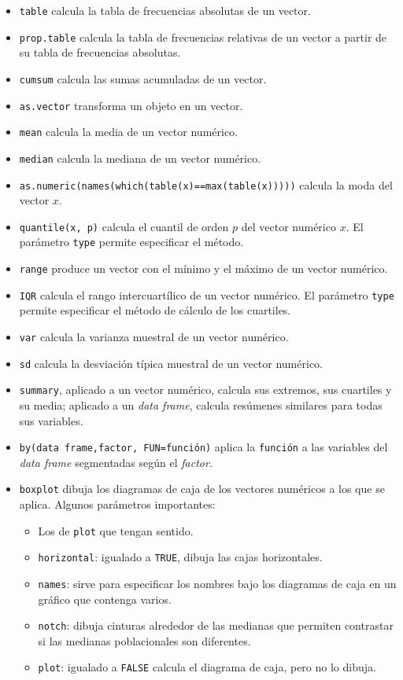 \documentclass[]{book}
\theoremstyle{definition}
\theoremstyle{definition}
\theoremstyle{definition}
\theoremstyle{remark}
\begin{document}
\begin{itemize}
\item
  \texttt{table} calcula la tabla de frecuencias absolutas de un vector.
\item
  \texttt{prop.table} calcula la tabla de frecuencias relativas de un vector a partir de su tabla de frecuencias absolutas.
\item
  \texttt{cumsum} calcula las sumas acumuladas de un vector.
\item
  \texttt{as.vector} transforma un objeto en un vector.
\item
  \texttt{mean} calcula la media de un vector numérico.
\item
  \texttt{median} calcula la mediana de un vector numérico.
\item
  \texttt{as.numeric(names(which(table(x)==max(table(x)))))} calcula la moda del vector \(x\).
\item
  \texttt{quantile(x,\ p)} calcula el cuantil de orden \(p\) del vector numérico \(x\). El parámetro \texttt{type} permite especificar el método.
\item
  \texttt{range} produce un vector con el mínimo y el máximo de un vector numérico.
\item
  \texttt{IQR} calcula el rango intercuartílico de un vector numérico. El parámetro \texttt{type} permite especificar el método de cálculo de los cuartiles.
\item
  \texttt{var} calcula la varianza muestral de un vector numérico.
\item
  \texttt{sd} calcula la desviación típica muestral de un vector numérico.
\item
  \texttt{summary}, aplicado a un vector numérico, calcula sus extremos, sus cuartiles y su media; aplicado a un \emph{data frame}, calcula resúmenes similares para todas sus variables.
\item
  \texttt{by(data\ frame,factor,\ FUN=función)} aplica la \texttt{función} a las variables del \emph{data frame} segmentadas según el \emph{factor}.
\item
  \texttt{boxplot} dibuja los diagramas de caja de los vectores numéricos a los que se aplica.
  Algunos parámetros importantes:

  \begin{itemize}
  \item
    Los de \texttt{plot} que tengan sentido.
  \item
    \texttt{horizontal}: igualado a \texttt{TRUE}, dibuja las cajas horizontales.
  \item
    \texttt{names}: sirve para especificar los nombres bajo los diagramas de caja en un gráfico que contenga varios.
  \item
    \texttt{notch}: dibuja cinturas alrededor de las medianas que permiten contrastar si las medianas poblacionales son diferentes.
  \item
    \texttt{plot}: igualado a \texttt{FALSE} calcula el diagrama de caja, pero no lo dibuja.
  \end{itemize}


\end{itemize}
\end{document}
